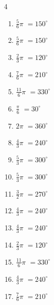\begin{multicols}{4}
\begin{enumerate}
  \item $\displaystyle \frac{5}{6}\pi$
        $\displaystyle =150^{\circ}$

  \item $\displaystyle \frac{5}{6}\pi$
        $\displaystyle =150^{\circ}$

  \item $\displaystyle \frac{2}{3}\pi$
        $\displaystyle =120^{\circ}$

  \item $\displaystyle \frac{7}{6}\pi$
        $\displaystyle =210^{\circ}$

  \item $\displaystyle \frac{11}{6}\pi$
        $\displaystyle =330^{\circ}$

  \item $\displaystyle \frac{\pi}{6}$
        $\displaystyle =30^{\circ}$

  \item $\displaystyle 2\pi$
        $\displaystyle =360^{\circ}$

  \item $\displaystyle \frac{4}{3}\pi$
        $\displaystyle =240^{\circ}$

\columnbreak %

  \item $\displaystyle \frac{5}{3}\pi$
        $\displaystyle =300^{\circ}$

  \item $\displaystyle \frac{5}{3}\pi$
        $\displaystyle =300^{\circ}$

  \item $\displaystyle \frac{3}{2}\pi$
        $\displaystyle =270^{\circ}$

  \item $\displaystyle \frac{4}{3}\pi$
        $\displaystyle =240^{\circ}$

  \item $\displaystyle \frac{4}{3}\pi$
        $\displaystyle =240^{\circ}$

  \item $\displaystyle \frac{2}{3}\pi$
        $\displaystyle =120^{\circ}$

  \item $\displaystyle \frac{11}{6}\pi$
        $\displaystyle =330^{\circ}$

  \item $\displaystyle \frac{4}{3}\pi$
        $\displaystyle =240^{\circ}$

  \item $\displaystyle \frac{7}{6}\pi$
        $\displaystyle =210^{\circ}$


\end{enumerate}
\end{multicols}
